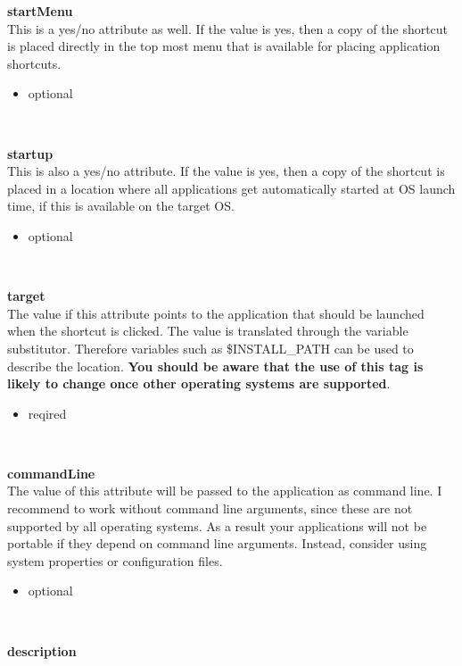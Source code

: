 \textbf{startMenu}\\

This is a yes/no attribute as well. If the value is yes, then a copy of
the shortcut is placed directly in the top most menu that is available
for placing application shortcuts.\\
\begin{itemize}
\item optional
\end{itemize}\

\textbf{startup}\\

This is also a yes/no attribute. If the value is yes, then a copy of the
shortcut is placed in a location where all applications get automatically
started at OS launch time, if this is available on the target OS.\\
\begin{itemize}
\item optional
\end{itemize}\

\textbf{target}\\

The value if this attribute points to the application that should be
launched when the shortcut is clicked. The value is translated through
the variable substitutor. Therefore variables such as \$INSTALL\_PATH can
be used to describe the location. \textbf{You should be aware that the use of
this tag is likely to change once other operating systems are
supported}.\\
\begin{itemize}
\item reqired
\end{itemize}\

\textbf{commandLine}\\

The value of this attribute will be passed to the application as command
line. I recommend to work without command line arguments, since these are
not supported by all operating systems. As a result your applications
will not be portable if they depend on command line arguments. Instead,
consider using system properties or configuration files.\\
\begin{itemize}
\item optional
\end{itemize}\

\textbf{description}\\

